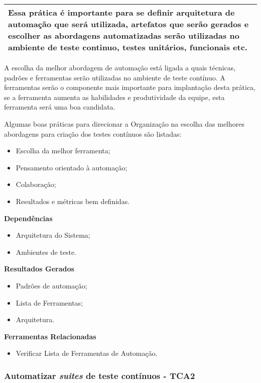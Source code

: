 \begin{table}[H]
\centering
\begin{tabular}{|p{130mm}|}
\hline
Essa prática é importante para se definir arquitetura de automação que será utilizada, artefatos que serão gerados e escolher as abordagens automatizadas serão utilizadas no ambiente de teste continuo, testes unitários, funcionais etc. \\ 
\hline
\end{tabular}
\end{table}

A escolha da melhor abordagem de automação está ligada a quais técnicas, padrões e ferramentas serão utilizadas no ambiente de teste contínuo. A ferramentas serão o componente mais importante para implantação desta prática, se a ferramenta aumenta as habilidades e produtividade da equipe, esta ferramenta será uma boa candidata.

Algumas boas práticas para direcionar a Organização na escolha das melhores abordagens para criação dos testes contínuos são listadas:

\begin{itemize}
	\item Escolha da melhor ferramenta;
	\item Pensamento orientado à automação;
	\item Colaboração;
	\item Resultados e métricas bem definidas.
\end{itemize}

\textbf{Dependências}
\begin{itemize}
    \item Arquitetura do Sistema;
    \item Ambientes de teste.
\end{itemize}

\textbf{Resultados Gerados}
\begin{itemize}
    \item Padrões de automação;
    \item Lista de Ferramentas;
    \item Arquitetura.
\end{itemize}

\textbf{Ferramentas Relacionadas}
\begin{itemize}
    \item Verificar Lista de Ferramentas de Automação.
\end{itemize}

\subsubsection{Automatizar \textit{suites} de teste contínuos - TCA2}
\label{sec:tca2}

